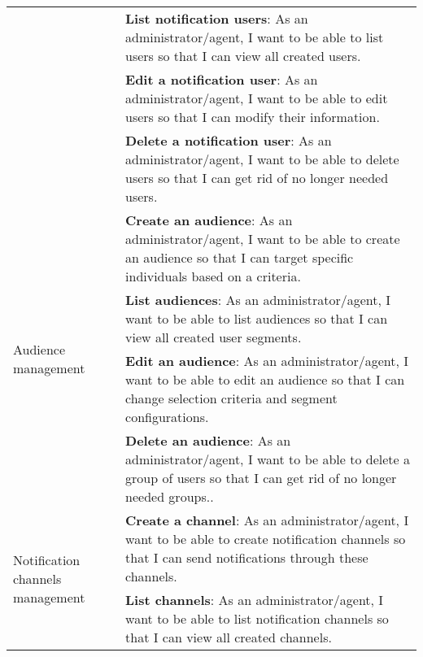 \begin{longtable}{ | m{}  | m{} | }
      \cline{2-2}
                                                              & \textbf{List notification users}: As an administrator/agent, I want to be able to list users so that I can view all created users.                                                           \\
      \cline{2-2}
                                                              & \textbf{Edit a notification user}: As an administrator/agent, I want to be able to edit users so that I can modify their information.                                                        \\
      \cline{2-2}
                                                              & \textbf{Delete a notification user}: As an administrator/agent, I want to be able to delete users so that I can get rid of no longer needed users.                                           \\
      \hline
      \multirow[t]{4}{5em}{Audience management}               & \textbf{Create an audience}: As an administrator/agent, I want to be able to create an audience so that I can target specific individuals based on a criteria.                               \\
      \cline{2-2}
                                                              & \textbf{List audiences}: As an administrator/agent, I want to be able to list audiences so that I can view all created user segments.                                                        \\
      \cline{2-2}
                                                              & \textbf{Edit an audience}: As an administrator/agent, I want to be able to edit an audience so that I can change selection criteria and segment configurations.                              \\
      \cline{2-2}
                                                              & \textbf{Delete an audience}: As an administrator/agent, I want to be able to delete a group of users so that I can get rid of no longer needed groups..                                      \\
      \hline
      \multirow[t]{4}{5em}{Notification channels management}  & \textbf{Create a channel}: As an administrator/agent, I want to be able to create notification channels so that I can send notifications through these channels.                             \\
      \cline{2-2}
                                                              & \textbf{List channels}: As an administrator/agent, I want to be able to list notification channels so that I can view all created channels.                                                  \\

\end{longtable}
